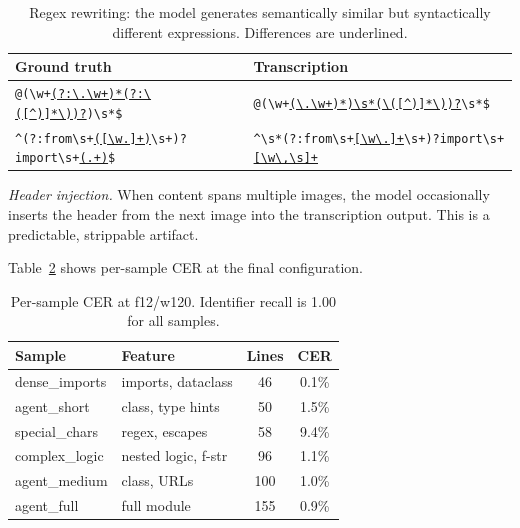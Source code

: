 \begin{table}[t]
\centering
\caption{Regex rewriting: the model generates semantically similar but syntactically different expressions. Differences are underlined.}
\label{tab:regex-rewrite}
\small
\begin{tabular}{p{3.6cm}p{3.6cm}}
\toprule
\textbf{Ground truth} & \textbf{Transcription} \\
\midrule
\texttt{@(\textbackslash w+\ul{(?:\textbackslash.\textbackslash w+)*(?:\textbackslash([{\^{}})\linebreak]*\textbackslash))?})\textbackslash s*\$} &
\texttt{@(\textbackslash w+\ul{(\textbackslash.\textbackslash w+)*)\textbackslash s*(\textbackslash([{\^{}})\linebreak]*\textbackslash))?}\textbackslash s*\$} \\
\midrule
\texttt{{\^{}}(?:from\textbackslash s+\ul{([\textbackslash w.]+)}\textbackslash s+)?\linebreak import\textbackslash s+\ul{(.+)}\$} &
\texttt{{\^{}}\textbackslash s*(?:from\textbackslash s+\ul{[\textbackslash w\textbackslash.]+}\textbackslash s+)?\linebreak import\textbackslash s+\ul{[\textbackslash w\textbackslash*,\textbackslash s]+}} \\
\bottomrule
\end{tabular}
\end{table}

\emph{Header injection.} When content spans multiple images, the model occasionally inserts the header from the next image into the transcription output. This is a predictable, strippable artifact.

Table~\ref{tab:per-sample} shows per-sample CER at the final configuration.

\begin{table}[t]
\centering
\caption{Per-sample CER at f12/w120. Identifier recall is 1.00 for all samples.}
\label{tab:per-sample}
\small
\begin{tabular}{llcc}
\toprule
\textbf{Sample} & \textbf{Feature} & \textbf{Lines} & \textbf{CER} \\
\midrule
dense\_imports      & imports, dataclass    & 46  & 0.1\% \\
agent\_short        & class, type hints     & 50  & 1.5\% \\
special\_chars      & regex, escapes        & 58  & 9.4\% \\
complex\_logic      & nested logic, f-str   & 96  & 1.1\% \\
agent\_medium       & class, URLs           & 100 & 1.0\% \\
agent\_full         & full module           & 155 & 0.9\% \\
\bottomrule
\end{tabular}
\end{table}

